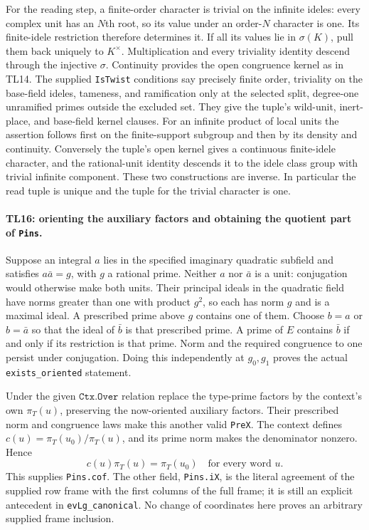 \documentclass[11pt,a4paper]{article}
\numberwithin{equation}{section}
\theoremstyle{remark}\newtheorem{remark}[theorem]{Remark}
\begin{document}
For the reading step, a finite-order character is trivial on
the infinite ideles: every complex unit has an $N$th root, so
its value under an order-$N$ character is one. Its finite-idele
restriction therefore determines it. If all its values lie in
$\sigma(K)$, pull them back uniquely to $K^\times$. Multiplication
and every triviality identity descend through the injective
$\sigma$. Continuity provides the open congruence kernel as in
TL14. The supplied \texttt{IsTwist} conditions say precisely
finite order, triviality on the base-field ideles, tameness, and
ramification only at the selected split, degree-one unramified
primes outside the excluded set. They give the tuple's wild-unit,
inert-place, and base-field kernel clauses. For an infinite
product of local units the assertion follows first on the
finite-support subgroup and then by its density and continuity.
Conversely the tuple's open kernel gives a continuous finite-idele
character, and the rational-unit identity descends it to the
idele class group with trivial infinite component. These two
constructions are inverse. In particular the read tuple is
unique and the tuple for the trivial character is one.

\paragraph{TL16: orienting the auxiliary factors and obtaining the
quotient part of \texttt{Pins}.}
Suppose an integral $a$ lies in the specified imaginary quadratic
subfield and satisfies $a\bar a=g$, with $g$ a rational prime.
Neither $a$ nor $\bar a$ is a unit: conjugation would otherwise
make both units. Their principal ideals in the quadratic field
have norms greater than one with product $g^2$, so each has norm
$g$ and is a maximal ideal. A prescribed prime above $g$ contains
one of them. Choose $b=a$ or $b=\bar a$ so that the ideal of
$\bar b$ is that prescribed prime. A prime of $E$ contains
$\bar b$ if and only if its restriction is that prime. Norm and
the required congruence to one persist under conjugation. Doing
this independently at $g_0,g_1$ proves the actual
\texttt{exists\_\allowbreak oriented} statement.

Under the given $\texttt{Ctx.Over}$ relation replace the type-prime
factors by the context's own $\pi_T(u)$, preserving the now-oriented
auxiliary factors. Their prescribed norm and congruence laws make
this another valid \texttt{PreX}. The context defines
$c(u)=\pi_T(u_0)/\pi_T(u)$, and its prime norm makes the denominator
nonzero. Hence
\[
 c(u)\pi_T(u)=\pi_T(u_0)\quad\text{for every word }u. \tag{TL.20}
\]
This supplies \texttt{Pins.cof}. The other field,
\texttt{Pins.iX}, is the literal agreement of the supplied row
frame with the first columns of the full frame; it is still an
explicit antecedent in \texttt{evLg\_\allowbreak canonical}. No change of
coordinates here proves an arbitrary supplied frame inclusion.
\end{document}

